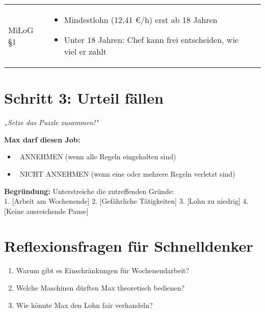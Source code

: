 \documentclass[12pt, a4paper]{article}
\newenvironment{taskbox}{%
    \begin{framed}
        \color{black}
    }{%
    \end{framed}
}
\newcommand{\checkbox}{\raisebox{-0.2ex}{\Large$\square$}}
\begin{document}
\begin{taskbox}
\begin{tabular}{|p{4cm}|p{8cm}|p{3cm}|}
\begin{minipage}[t]{8cm}
            \end{minipage} & \checkbox \\ 
            \hline
            MiLoG §1 & \begin{minipage}[t]{8cm}
                \begin{itemize}[leftmargin=*,nosep]
                    \item Mindestlohn (12,41 €/h) erst ab 18 Jahren
                    \item Unter 18 Jahren: Chef kann frei entscheiden, wie viel er zahlt
                \end{itemize}
            \end{minipage} & \checkbox \\ 
            \hline
        \end{tabular}
    \end{taskbox}

    \vspace{0.3cm}

    \section*{\color{taskgold}Schritt 3: Urteil fällen}
    
    \begin{taskbox}
        \textit{„Setze das Puzzle zusammen!"}
        
        \textbf{Max darf diesen Job:}
        \begin{itemize}[leftmargin=*]
            \item \checkbox\ \textcolor{acceptgreen}{ANNEHMEN} (wenn alle Regeln eingehalten sind)
            \item \checkbox\ \textcolor{rejectred}{NICHT ANNEHMEN} (wenn eine oder mehrere Regeln verletzt sind)
        \end{itemize}
        
        \textbf{Begründung:} Unterstreiche die zutreffenden Gründe:\\
        1. [Arbeit am Wochenende] 2. [Gefährliche Tätigkeiten] 3. [Lohn zu niedrig] 4. [Keine ausreichende Pause]
    \end{taskbox}

    \vspace{0.3cm}

    \section*{\color{taskgreen}Reflexionsfragen für Schnelldenker}
    
    \begin{taskbox}
        \begin{enumerate}
            \item Warum gibt es Einschränkungen für Wochenendarbeit?
            \item Welche Maschinen dürften Max theoretisch bedienen?
            \item Wie könnte Max den Lohn fair verhandeln?
        \end{enumerate}
    \end{taskbox}
\end{document}
